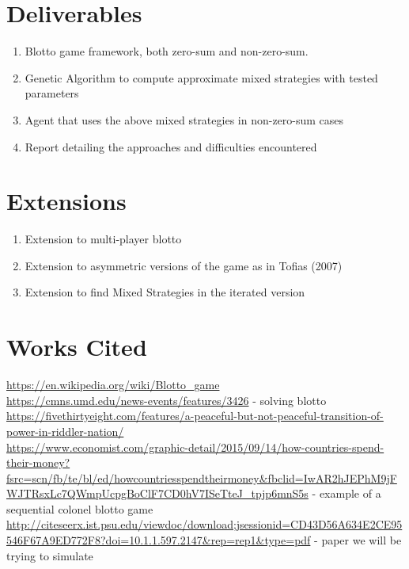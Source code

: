 \documentclass[11pt,letter]{article}
\begin{document}
\section{Deliverables} %
\begin{enumerate}
	\item Blotto game framework, both zero-sum and non-zero-sum.
	\item Genetic Algorithm to compute approximate mixed strategies with tested parameters
	\item Agent that uses the above mixed strategies in non-zero-sum cases
	\item Report detailing the approaches and difficulties encountered
\end{enumerate}
\section{Extensions} %
\begin{enumerate}
	\item Extension to multi-player blotto
	\item Extension to asymmetric versions of the game as in Tofias (2007)
	\item Extension to find Mixed Strategies in the iterated version
\end{enumerate}
\section{Works Cited} %
\url{https://en.wikipedia.org/wiki/Blotto_game} \\
\url{https://cmns.umd.edu/news-events/features/3426} - solving blotto \\
\url{https://fivethirtyeight.com/features/a-peaceful-but-not-peaceful-transition-of-power-in-riddler-nation/} \\
\url{https://www.economist.com/graphic-detail/2015/09/14/how-countries-spend-their-money?fsrc=scn/fb/te/bl/ed/howcountriesspendtheirmoney&fbclid=IwAR2hJEPhM9jFWJTRsxLc7QWmpUcpgBoClF7CD0hV7ISeTteJ_tpjp6mnS5s} - example of a sequential colonel blotto game \\
\url{http://citeseerx.ist.psu.edu/viewdoc/download;jsessionid=CD43D56A634E2CE95546F67A9ED772F8?doi=10.1.1.597.2147&rep=rep1&type=pdf} - paper we will be trying to simulate
\end{document}

